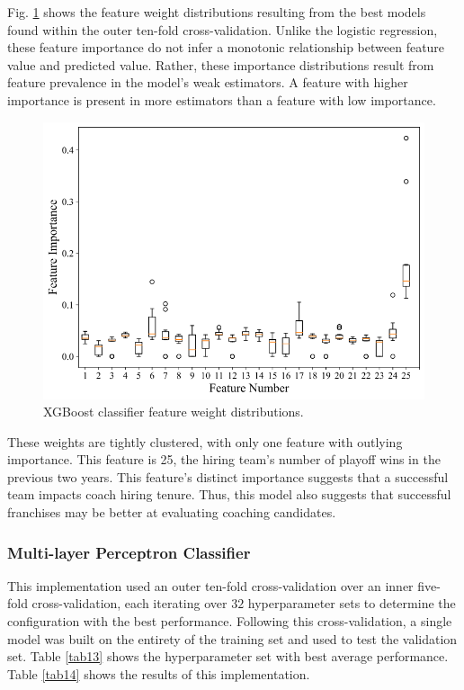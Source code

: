 \documentclass[conference]{IEEEtran}
\begin{document}
Fig. \ref{fig13} shows the feature weight distributions resulting from the best models found within the outer ten-fold cross-validation. Unlike the logistic regression, these feature importance do not infer a monotonic relationship between feature value and predicted value. Rather, these importance distributions result from feature prevalence in the model's weak estimators. A feature with higher importance is present in more estimators than a feature with low importance. 

\begin{figure}[htbp]
\centerline{\includegraphics[width=1\linewidth]{weight5.png}}
\caption{XGBoost classifier feature weight distributions.}
\label{fig13}
\end{figure}

These weights are tightly clustered, with only one feature with outlying importance. This feature is 25, the hiring team's number of playoff wins in the previous two years. This feature's distinct importance suggests that a successful team impacts coach hiring tenure. Thus, this model also suggests that successful franchises may be better at evaluating coaching candidates. 

\subsubsection{Multi-layer Perceptron Classifier}
This implementation used an outer ten-fold cross-validation over an inner five-fold cross-validation, each iterating over $32$ hyperparameter sets to determine the configuration with the best performance. Following this cross-validation, a single model was built on the entirety of the training set and used to test the validation set. Table \ref{tab13} shows the hyperparameter set with best average performance. Table \ref{tab14} shows the results of this implementation.
\end{document}
